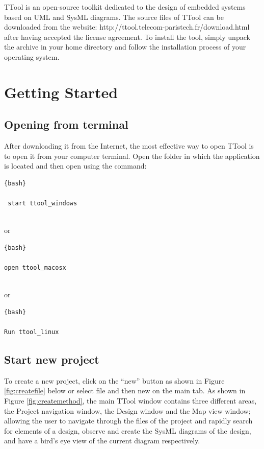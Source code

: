 \documentclass[12pt]{article}
\begin{document}
TTool is an open-source toolkit dedicated to the design of embedded systems based on UML and SysML diagrams. The source files of TTool can be downloaded from the website: http://ttool.telecom-paristech.fr/download.html
after having accepted the license agreement. To install the tool, simply unpack the archive in your home directory and follow the installation process of your operating system.

\section{Getting Started}
\subsection{Opening from terminal}

After downloading it from the Internet, the most effective way to open TTool is to open it from your computer terminal. Open the folder in which the application is located and then open using the command:
\begin{lstlisting}{bash}

 start ttool_windows
 

\end{lstlisting}

or 
\begin{lstlisting}{bash}

open ttool_macosx
 

\end{lstlisting}

or \begin{lstlisting}{bash}

Run ttool_linux

\end{lstlisting}


\subsection{Start new project}
To create a new project, click on the “new” button as shown in Figure \ref{fig:createfile} below or select file and then new on the main tab. As shown in Figure \ref{fig:createmethod}, the main TTool window contains three different areas, the Project navigation window, the Design window and the Map view window; allowing the user to navigate through the files of the project and rapidly search for elements of a design, observe and create the SysML diagrams of the design, and have a bird’s eye view of the current diagram respectively.
\end{document}
